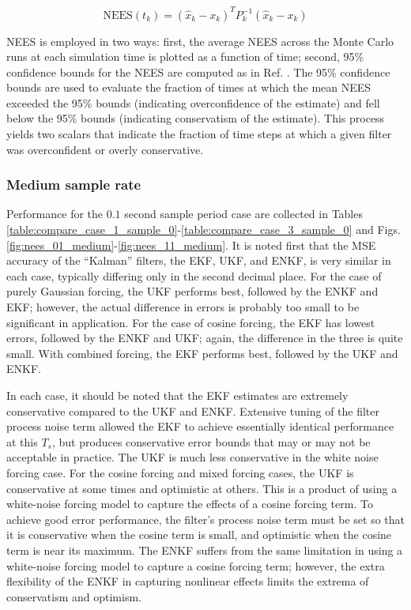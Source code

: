 \documentclass[]{article}
\begin{document}
\begin{equation}
\mathrm{NEES}(t_k) = (\hat{x}_k-x_k)^T P_k^{-1} (\hat{x}_k-x_k)
\end{equation}

NEES is employed in two ways: first, the average NEES across the Monte Carlo runs at each simulation time is plotted as a function of time; second, 95\% confidence bounds for the NEES are computed as in Ref. \cite{neesPaper}. The 95\% confidence bounds are used to evaluate the fraction of times at which the mean NEES exceeded the 95\% bounds (indicating overconfidence of the estimate) and fell below the 95\% bounds (indicating conservatism of the estimate). This process yields two scalars that indicate the fraction of time steps at which a given filter was overconfident or overly conservative.

\subsubsection{Medium sample rate}

Performance for the $0.1$ second sample period case are collected in Tables \ref{table:compare_case_1_sample_0}-\ref{table:compare_case_3_sample_0} and Figs. \ref{fig:nees_01_medium}-\ref{fig:nees_11_medium}. It is noted first that the MSE accuracy of the ``Kalman'' filters, the EKF, UKF, and ENKF, is very similar in each case, typically differing only in the second decimal place. For the case of purely Gaussian forcing, the UKF performs best, followed by the ENKF and EKF; however, the actual difference in errors is probably too small to be significant in application. For the case of cosine forcing, the EKF has lowest errors, followed by the ENKF and UKF; again, the difference in the three is quite small. With combined forcing, the EKF performs best, followed by the UKF and ENKF.

In each case, it should be noted that the EKF estimates are extremely conservative compared to the UKF and ENKF. Extensive tuning of the filter process noise term allowed the EKF to achieve essentially identical performance at this $T_s$, but produces conservative error bounds that may or may not be acceptable in practice. The UKF is much less conservative in the white noise forcing case. For the cosine forcing and mixed forcing cases, the UKF is conservative at some times and optimistic at others. This is a product of using a white-noise forcing model to capture the effects of a cosine forcing term. To achieve good error performance, the filter's process noise term must be set so that it is conservative when the cosine term is small, and optimistic when the cosine term is near its maximum. The ENKF suffers from the same limitation in using a white-noise forcing model to capture a cosine forcing term; however, the extra flexibility of the ENKF in capturing nonlinear effects limits the extrema of conservatism and optimism.
\end{document}
